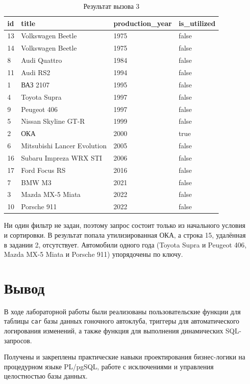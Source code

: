\documentclass[oneside,a4paper,14pt]{extarticle}
\begin{document}
\begin{table}[H]
\centering
\footnotesize
\caption{Результат вызова 3}\label{tab:dyn3}
\begin{tabular}{|l|l|l|l|}
\hline
\textbf{id} & \textbf{title} & \textbf{production\_\allowbreak year} & \textbf{is\_\allowbreak utilized} \\ \hline
13 & Volkswagen Beetle & 1975 & false \\ \hline
14 & Volkswagen Beetle & 1975 & false \\ \hline
8 & Audi Quattro & 1984 & false \\ \hline
11 & Audi RS2 & 1994 & false \\ \hline
1 & ВАЗ 2107 & 1995 & false \\ \hline
4 & Toyota Supra & 1997 & false \\ \hline
9 & Peugeot 406 & 1997 & false \\ \hline
5 & Nissan Skyline GT-R & 1999 & false \\ \hline
2 & ОКА & 2000 & true \\ \hline
6 & Mitsubishi Lancer Evolution & 2005 & false \\ \hline
16 & Subaru Impreza WRX STI & 2006 & false \\ \hline
17 & Ford Focus RS & 2016 & false \\ \hline
7 & BMW M3 & 2021 & false \\ \hline
3 & Mazda MX-5 Miata & 2022 & false \\ \hline
10 & Porsche 911 & 2022 & false \\ \hline
\end{tabular}
\end{table}

Ни один фильтр не задан, поэтому запрос состоит только из начального условия и сортировки. В результат попала утилизированная ОКА, а строка 15, удалённая в задании 2, отсутствует. Автомобили одного года (Toyota Supra и Peugeot 406, Mazda MX-5 Miata и Porsche 911) упорядочены по ключу.

\newpage
\section*{Вывод}

В ходе лабораторной работы были реализованы пользовательские функции для таблицы \texttt{car} базы данных гоночного автоклуба, триггеры для автоматического логирования изменений, а также функция для выполнения динамических SQL-запросов.

Получены и закреплены практические навыки проектирования бизнес-логики на процедурном языке PL/pgSQL, работе с исключениями и управления целостностью базы данных. 
\end{document}
